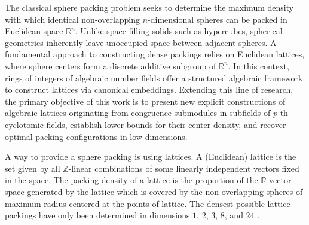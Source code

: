 \documentclass{amsart}
\begin{document}


The classical sphere packing problem seeks to determine the maximum density with which identical non-overlapping $n$-dimensional spheres can be packed in Euclidean space $\mathbb{R}^n$. Unlike space-filling solids such as hypercubes, spherical geometries inherently leave unoccupied space between adjacent spheres. A fundamental approach to constructing dense packings relies on Euclidean lattices, where sphere centers form a discrete additive subgroup of $\mathbb{R}^n$. In this context, rings of integers of algebraic number fields offer a structured algebraic framework to construct lattices via canonical embeddings. Extending this line of research, the primary objective of this work is to present new explicit constructions of algebraic lattices originating from congruence submodules in subfields of $p$-th cyclotomic fields, establish lower bounds for their center density, and recover optimal packing configurations in low dimensions.

A way to provide a sphere packing is using lattices. A (Euclidean) lattice is the set given by all $\mathbb{Z}$-linear combinations of some linearly independent vectors fixed in the space. The packing density of a lattice is the proportion of the $\mathbb{R}$-vector space generated by the lattice which is covered by the non-overlapping spheres of maximum radius centered at the points of lattice. The densest possible lattice packings have only been determined in dimensions $1$, $2$, $3$, $8$, and $24$ \cite{sloane,maryna}.
\end{document}
